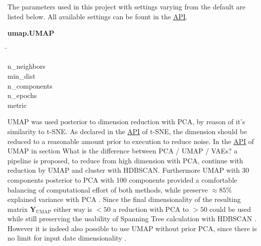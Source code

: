 The parameters used in this project with settings varying from the default are listed below. All available settings can be fount in the \href{https://umap-learn.readthedocs.io/en/latest/api.html}{API}.

\begin{leftbar}
    \textbf{umap.UMAP}
    \begin{nstabbing}
        \qquad\qquad\qquad\qquad\qquad\quad\=\kill

        n\_neighbors \\
        
        min\_dist \\
        
        n\_components \\
        
        n\_epochs \\
        
        metric 
    \end{nstabbing}
\end{leftbar}

\gls{UMAP} was used posterior to dimension reduction with \gls{PCA}, by reason of it's similarity to \gls{t-SNE}. As declared in the \href{https://scikit-learn.org/stable/modules/generated/sklearn.manifold.TSNE.html}{API} of \gls{t-SNE}, the dimension should be reduced to a reasonable amount prior to execution to reduce noise. In the \href{https://umap-learn.readthedocs.io/en/latest/api.html}{API} of \gls{UMAP} in section \glqq What is the difference between PCA / UMAP / VAEs?\grqq{} a pipeline is proposed, to reduce from high dimension with \gls{PCA}, continue with reduction by \gls{UMAP} and cluster with \gls{HDBSCAN}. Furthermore \gls{UMAP} with 30 components posterior to \gls{PCA} with 100 components provided a comfortable balancing of computational effort of both methods, while preserve $\approx 85\%$ explained variance with \gls{PCA} \autocite{mcinnes_umap_2020}. Since the final dimensionality of the resulting matrix $\mathbf{Y}_{\text{UMAP}}$ either way is $<50$ a reduction with \gls{PCA} to $>50$ could be used while still preserving the usability of Spanning Tree calculation with \gls{HDBSCAN} \autocite{mcinnes_hdbscan_2017}. However it is indeed also possible to use \gls{UMAP} without prior \gls{PCA}, since there is no limit for input date dimensionality \autocite{mcinnes_umap_2020}. 